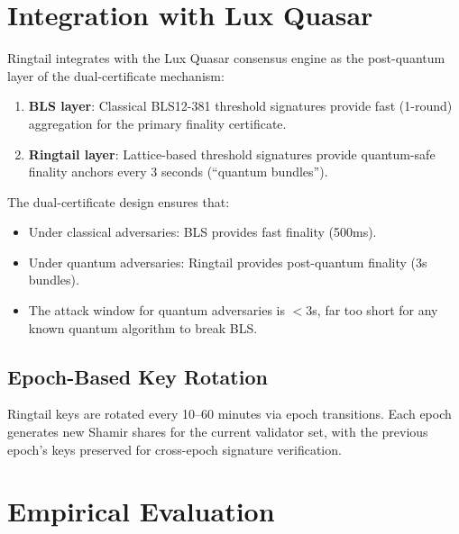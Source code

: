 \documentclass[11pt,a4paper]{article}
\begin{document}
\section{Integration with Lux Quasar}
\label{sec:integration}

Ringtail integrates with the Lux Quasar consensus engine as the post-quantum layer
of the dual-certificate mechanism:

\begin{enumerate}[nosep]
\item \textbf{BLS layer}: Classical BLS12-381 threshold signatures provide fast (1-round)
aggregation for the primary finality certificate.
\item \textbf{Ringtail layer}: Lattice-based threshold signatures provide quantum-safe
finality anchors every 3 seconds (``quantum bundles'').
\end{enumerate}

The dual-certificate design ensures that:
\begin{itemize}[nosep]
\item Under classical adversaries: BLS provides fast finality (500ms).
\item Under quantum adversaries: Ringtail provides post-quantum finality (3s bundles).
\item The attack window for quantum adversaries is $< 3$s, far too short for any known
quantum algorithm to break BLS.
\end{itemize}

\subsection{Epoch-Based Key Rotation}

Ringtail keys are rotated every 10--60 minutes via epoch transitions. Each epoch
generates new Shamir shares for the current validator set, with the previous epoch's
keys preserved for cross-epoch signature verification.

\section{Empirical Evaluation}
\label{sec:evaluation}
\end{document}
